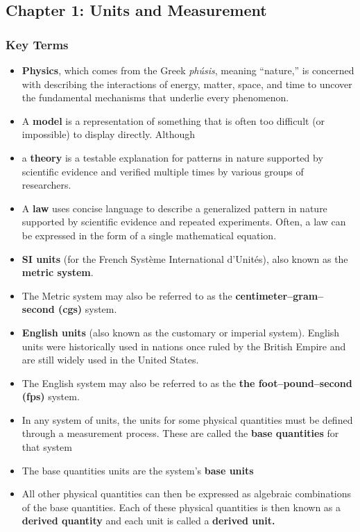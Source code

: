 \documentclass{report}
\begin{document}
    \pagebreak 
    \bigbreak \noindent 
    \subsection{Chapter 1: Units and Measurement}
    \smallbreak \noindent
    \subsubsection{Key Terms}
    \begin{itemize}
        \item \textbf{Physics}, which comes from the Greek \textit{phúsis}, meaning “nature,” is concerned with describing the interactions of energy, matter, space, and time to uncover the fundamental mechanisms that underlie every phenomenon.
        \item A \textbf{model} is a representation of something that is often too difficult (or impossible) to display directly. Although
        \item a \textbf{theory} is a testable explanation for patterns in nature supported by scientific evidence and verified multiple times by various groups of researchers.
        \item A \textbf{law} uses concise language to describe a generalized pattern in nature supported by scientific evidence and repeated experiments. Often, a law can be expressed in the form of a single mathematical equation. 
        \item \textbf{SI units} (for the French Système International d’Unités), also known as the \textbf{metric system}.
        \item The Metric system may also be referred to as the \textbf{centimeter–gram–second (cgs)} system.
        \item  \textbf{English units} (also known as the customary or imperial system). English units were historically used in nations once ruled by the British Empire and are still widely used in the United States.
        \item The English system may also be referred to as the \textbf{the foot–pound–second (fps)} system. 
        \item In any system of units, the units for some physical quantities must be defined through a measurement process. These are called the \textbf{base quantities} for that system
        \item The base quantities units are the system’s \textbf{base units}
        \item All other physical quantities can then be expressed as algebraic combinations of the base quantities. Each of these physical quantities is then known as a \textbf{derived quantity} and each unit is called a \textbf{derived unit.}

\end{itemize}
\end{document}
